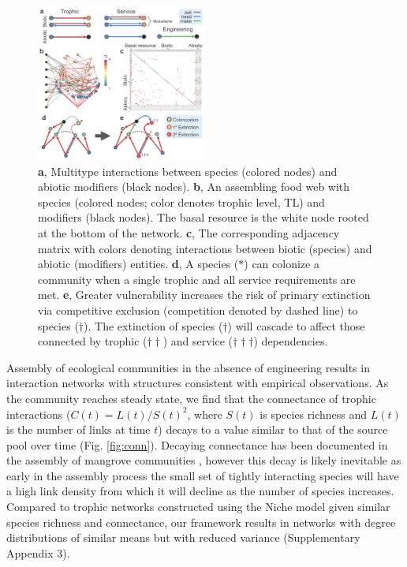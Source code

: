 \documentclass[twocolumn,preprintnumbers,amsmath,amssymb,superscriptaddress,linenumbers]{revtex4-1}
\begin{document}
\begin{figure}[h!]
\centering
\includegraphics[width=0.5\textwidth]{fig_model.png}
\vspace{0mm}
\caption{
\textbf{a}, Multitype interactions between species (colored nodes) and abiotic modifiers (black nodes).
\textbf{b}, An assembling food web with species (colored nodes; color denotes trophic level, TL) and modifiers (black nodes). The basal resource is the white node rooted at the bottom of the network.
\textbf{c}, The corresponding adjacency matrix with colors denoting interactions between biotic (species) and abiotic (modifiers) entities.
\textbf{d}, A species ($\ast$) can colonize a community when a single trophic and all service requirements are met.
\textbf{e}, Greater vulnerability increases the risk of primary extinction via competitive exclusion (competition denoted by dashed line) to species ($\dag$).
The extinction of species ($\dag$) will cascade to affect those connected by trophic ($\dag \dag$) and service ($\dag \dag \dag$) dependencies. 
\vspace{-3mm}
}
\vspace{0mm}
\label{fig:model}
\end{figure}

Assembly of ecological communities in the absence of engineering results in interaction networks with structures consistent with empirical observations.
As the community reaches steady state, we find that the connectance of trophic interactions ($C(t)=L(t)/S(t)^2$, where $S(t)$ is species richness and $L(t)$ is the number of links at time $t$) decays to a value similar to that of the source pool over time (Fig. \ref{fig:conn}).
Decaying connectance has been documented in the assembly of mangrove communities \cite{Piechnik2008}, however this decay is likely inevitable as early in the assembly process the small set of tightly interacting species will have a high link density from which it will decline as the number of species increases.
Compared to trophic networks constructed using the Niche model \cite{Williams2000} given similar species richness and connectance, our framework results in networks with degree distributions of similar means but with reduced variance (Supplementary Appendix 3).
\end{document}
